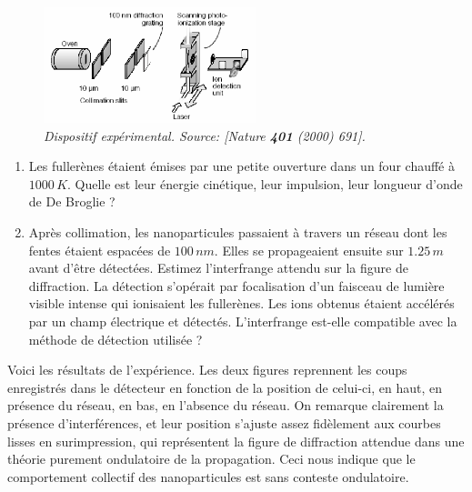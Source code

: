 \begin{figure}[h!]
\begin{center}
\includegraphics[width=0.55\textwidth]{Pictures/Fullerenes.PNG}
\end{center}
\caption{\textit{Dispositif expérimental. Source: [Nature \textbf{401} (2000) 691].}}
\end{figure}

\begin{enumerate}
\item Les fullerènes étaient émises par une petite ouverture dans un four chauffé à $1000 \, K$. Quelle est leur énergie cinétique, leur impulsion, leur longueur d'onde de De Broglie ?
\item Après collimation, les nanoparticules passaient à travers un réseau dont les fentes étaient espacées de $100\, nm$. Elles se propageaient ensuite sur $1.25 \, m$ avant d'être détectées. Estimez l'interfrange attendu sur la figure de diffraction. La détection s'opérait par focalisation d'un faisceau de lumière visible intense qui ionisaient les fullerènes. Les ions obtenus étaient accélérés par un champ électrique et détectés. L'interfrange est-elle compatible avec la méthode de détection utilisée ?
\end{enumerate}
Voici les résultats de l'expérience. Les deux figures reprennent les coups enregistrés dans le détecteur en fonction de la position de celui-ci, en haut, en présence du réseau, en bas, en l'absence du réseau. On remarque clairement la présence d'interférences, et leur position s'ajuste assez fidèlement aux courbes lisses en surimpression, qui représentent la figure de diffraction attendue dans une théorie purement ondulatoire de la propagation. Ceci nous indique que le comportement collectif des nanoparticules est sans conteste ondulatoire.


